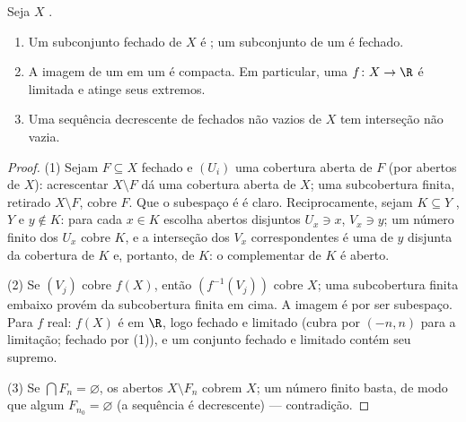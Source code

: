 \begin{theorem}\label{thm:b3:topology:compactprops}
Seja $X$ .
\begin{enumerate}
  \item Um subconjunto fechado de $X$ é ; um subconjunto
         de um  é fechado.
  \item A imagem  de um  em um  é compacta. Em particular, uma 
        $f\colon X
        \to \R$ é limitada e atinge seus extremos.
  \item Uma sequência decrescente de fechados não vazios de $X$ tem
        interseção não vazia.
\end{enumerate}
\end{theorem}

\begin{proof}
(1) Sejam $F \subseteq X$ fechado e $(U_i)$ uma cobertura aberta de $F$
(por abertos de $X$): acrescentar $X \setminus F$ dá uma cobertura aberta de
$X$; uma subcobertura finita, retirado $X \setminus F$, cobre $F$. Que o
subespaço é  é claro. Reciprocamente, sejam $K \subseteq Y$ ,
$Y$  e $y \notin K$: para cada $x \in K$ escolha abertos disjuntos
$U_x \ni x$, $V_x \ni y$; um número finito dos $U_x$ cobre $K$, e a
interseção dos $V_x$ correspondentes é uma  de $y$
disjunta da cobertura de $K$ e, portanto, de $K$: o complementar
de $K$ é aberto.

(2) Se $(V_j)$ cobre $f(X)$, então $(f^{-1}(V_j))$ cobre $X$; uma
subcobertura finita embaixo provém da subcobertura finita em cima. A
imagem é  por ser subespaço. Para $f$ real: $f(X)$ é
 em $\R$, logo fechado e limitado (cubra por $(-n, n)$ para a
limitação; fechado por (1)), e um conjunto fechado e limitado contém
seu supremo.

(3) Se $\bigcap F_n = \varnothing$, os abertos $X \setminus F_n$ cobrem $X$; um número finito basta,
de modo que algum $F_{n_0} =
\varnothing$ (a sequência é decrescente) --- contradição.
\end{proof}

